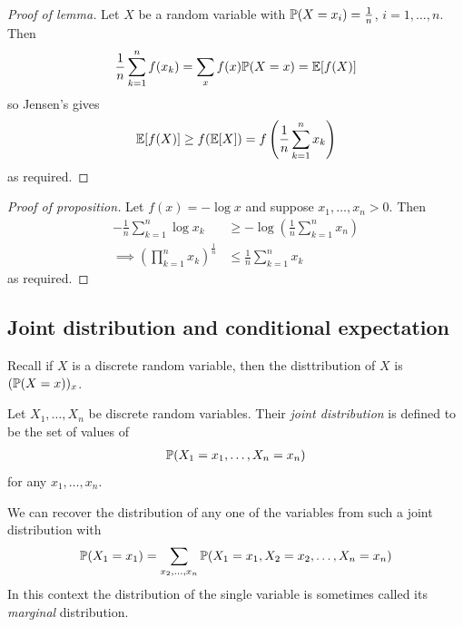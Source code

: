 \documentclass{../../template/note}
\begin{document}
    \begin{proof}[Proof of lemma]
        Let \(X\) be a random variable with \(\mathbb P(X = x_i) = \frac 1 n\), \(i=1, \dots, n\). Then
        \begin{align*}
            \frac 1 n \sum_{k=1}^n f(x_k) = \sum_x f(x) \mathbb P(X = x) = \mathbb E[f(X)]
        \end{align*}
        so Jensen's gives
        \begin{align*}
            \mathbb E[f(X)] \geq f(\mathbb E[X]) = f\left(\frac 1 n \sum_{k=1}^n x_k\right)
        \end{align*}
        as required.        
    \end{proof}
    
    \begin{proof}[Proof of proposition]
        Let \(f(x) = -\log x\) and suppose \(x_1, \dots, x_n > 0\). Then
        \begin{align*}
            -\frac 1 n \sum_{k=1}^n \log x_k &\geq -\log \left(\frac 1 n \sum_{k=1}^n x_n\right) \\
            \implies \left(\prod_{k=1}^n x_k\right)^{\frac 1 n} &\leq \frac 1 n \sum_{k=1}^n x_k
        \end{align*}
        as required.        
    \end{proof}
    
    \subsection{Joint distribution and conditional expectation}

    Recall if \(X\) is a discrete random variable, then the disttribution of \(X\) is \((\mathbb P(X = x))_x\).

    \begin{definition}
        Let \(X_1, \dots, X_n\) be discrete random variables. Their \emph{joint distribution} is defined to be the set of values of
        \begin{align*}
            \mathbb P(X_1 = x_1, \dots, X_n = x_n)
        \end{align*}
        for any \(x_1, \dots, x_n\).        
    \end{definition}
    
    \begin{remark*}
        We can recover the distribution of any one of the variables from such a joint distribution with
        \begin{align*}
            \mathbb P(X_1 = x_1) = \sum_{x_2, \dots, x_n} \mathbb P(X_1 = x_1, X_2 = x_2, \dots, X_n = x_n)
        \end{align*}
        In this context the distribution of the single variable is sometimes called its \emph{marginal} distribution.        
    \end{remark*}
    
\end{document}
